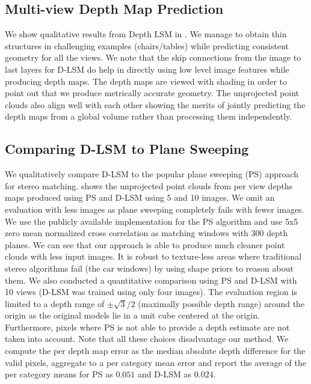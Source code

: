 \documentclass[../thesis.tex]{subfiles}
\begin{document}
\subsection{Multi-view Depth Map Prediction}
We show qualitative results from Depth LSM in . We manage to obtain thin structures in challenging examples (chairs/tables) while predicting consistent geometry for all the views. We note that the skip connections from the image to last layers for D-LSM do help in directly using low level image features while producing depth maps. The depth maps are viewed with shading in order to point out that we produce metrically accurate geometry. The unprojected point clouds also align well with each other showing the merits of jointly predicting the depth maps from a global volume rather than processing them independently.

\subsection{Comparing D-LSM to Plane Sweeping}
We qualitatively compare D-LSM to the popular plane sweeping (PS) approach \cite{collins1996space,yang2003real} for stereo matching.  shows the unprojected point clouds from per view depths maps produced using PS and D-LSM using 5 and 10 images. We omit an evaluation with less images as plane sweeping completely fails with fewer images. We use the publicly available implementation for the PS algorithm \cite{hane2014real} and use 5x5 zero mean normalized cross correlation as matching windows with 300 depth planes. We can see that our approach is able to produce much cleaner point clouds with less input images. It is robust to texture-less areas where traditional stereo algorithms fail (\eg the car windows) by using shape priors to reason about them. We also conducted a quantitative comparison using PS and D-LSM with 10 views (D-LSM was trained using only four images). The evaluation region is limited to a depth range of $\pm \sqrt{3}/2$ (maximally possible depth range) around the origin as the original models lie in a unit cube centered at the origin. Furthermore, pixels where PS is not able to provide a depth estimate are not taken into account. Note that all these choices disadvantage our method. We compute the per depth map error as the median absolute depth difference for the valid pixels, aggregate to a per category mean error and report the average of the per category means for PS as $0.051$ and D-LSM as $0.024$.



\end{document}
